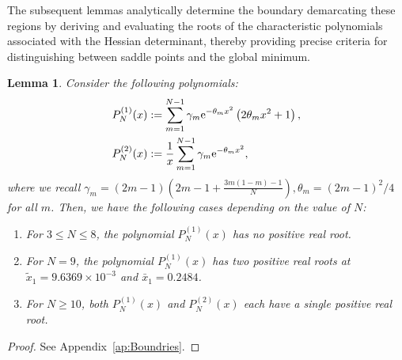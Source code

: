 \documentclass[journal,12pt,onecolumn,draftclsnofoot]{IEEEtran}
\newtheorem{lem}{Lemma}
\theoremstyle{definition}
\begin{document}
The subsequent lemmas analytically determine the boundary demarcating these regions by deriving and evaluating the roots of the characteristic polynomials associated with the Hessian determinant, thereby providing precise criteria for distinguishing between saddle points and the global minimum.


\begin{lem}\label{lem:Boundries}
    Consider the following polynomials:
    \begin{subequations}
       \label{eq:Polydefinition}
       \begin{align}
   P^{(1)}_{N}(x)& := \sum_{m=1}^{N-1}\gamma_{m}{\rm e}^{-\theta_{m}x^{2}}\left(2\theta_{m}x^{2}+1\right), \\
      P^{(2)}_{N}(x) & := \frac{1}{x}\sum_{m=1}^{N-1}\gamma_{m}{\rm e}^{-\theta_{m}x^{2}}, 
   \end{align}
    \end{subequations}
    where we recall $\gamma_m = (2m-1)(2m-1+\frac{3m(1-m)-1}{N}), \theta_m=(2m-1)^2/4$ for all $m$.  Then, we have the following cases depending on the value of $N$: 
    \begin{enumerate}
       \item For $3 \leq N\leq 8$, the polynomial $P^{(1)}_{N}(x)$ has no positive real root. 
        \item  For $N = 9$, the polynomial $P^{(1)}_{N}(x)$ has two positive real roots at $\tilde{x}_1 = 9.6369\times 10^{-3}$ and $\bar{x}_1 = 0.2484$. 
        \item For $N\geq 10$,   both $P^{(1)}_{N}(x)$ and $P^{(2)}_{N}(x)$ each have a single positive real root.
    \end{enumerate}
\end{lem} 
\begin{proof}
    See Appendix~\ref{ap:Boundries}. 
\end{proof}
\end{document}
